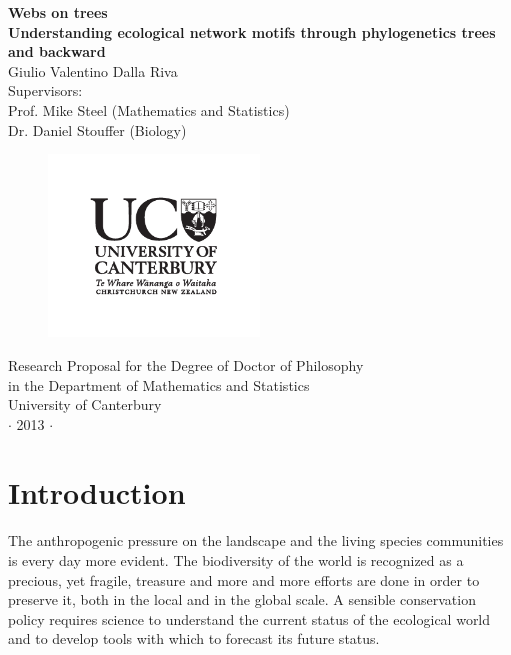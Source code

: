 \documentclass[12pt,a4paper]{report}
\begin{document}
\pagestyle{empty}
\begin{center}
{\Large \textbf{Webs on trees}\\}
{\large \textbf{Understanding ecological network motifs through phylogenetics trees and backward\\}}
\vspace{1cm}
{\large 
Giulio Valentino Dalla Riva\\
\vspace{0.5cm}
Supervisors: \\
Prof. Mike Steel (Mathematics and Statistics)\\
Dr. Daniel Stouffer (Biology)}\\
\end{center}

\begin{figure}[h]
	\centering
		\includegraphics[width=0.5\textwidth]{images/UClogo}
\end{figure}

\vspace{1cm}
\begin{center}
{\large  
Research Proposal for the Degree of Doctor of Philosophy\\
in the Department of Mathematics and Statistics\\
University of Canterbury\\
\vspace{0.3cm}
$\cdot$ 2013 $\cdot$}
\end{center}
\vspace{1cm}
\tableofcontents

\chapter{Introduction}

The anthropogenic pressure on the landscape and the living species communities is every day more evident. The biodiversity of the world is recognized as a precious, yet fragile, treasure and more and more efforts are done in order to preserve it, both in the local and in the global scale. A sensible conservation policy requires science to understand the current status of the ecological world and to develop tools with which to forecast its future status.
\end{document}
